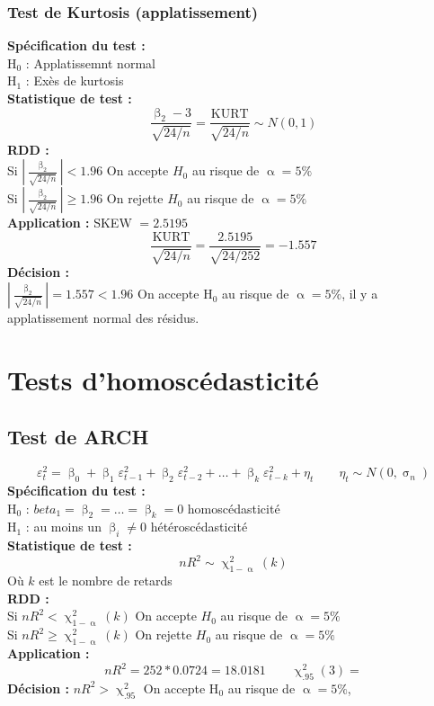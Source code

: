 \documentclass[A4paper]{article}
\begin{document}
\subsubsection{Test de Kurtosis (applatissement)}
\textbf{Spécification du test :} \\
H$_0$ : Applatissemnt normal \\
H$_1$ : Exès de kurtosis \\
\textbf{Statistique de test :}
\begin{equation*}
		\frac{\upbeta_2-3}{\sqrt{24/n}}=  \frac{\text{KURT}}{\sqrt{24/n}} \sim N(0,1)
\end{equation*}
\textbf{RDD :} \\
Si $\left| \frac{\upbeta_2}{\sqrt{24/n}} \right|  < 1.96$ On accepte $H_0$ au risque de $\upalpha = 5\% $\\
Si $\left| \frac{\upbeta_2}{\sqrt{24/n}} \right|  \geq 1.96$ On rejette $H_0$ au risque de $\upalpha = 5\%$ \\
\textbf{Application :} SKEW $= 2.5195 $
\begin{equation*}
	\frac{\text{KURT}}{\sqrt{24/n}} = \frac{2.5195}{\sqrt{24/252}} = -1.557
\end{equation*}
\textbf{Décision :}\\
$\left| \frac{\upbeta_2}{\sqrt{24/n}} \right| = 1.557 < 1.96 $ On accepte H$_0$ au risque de  $\upalpha=5\%$, il y a applatissement normal des résidus.

\newpage
\section{Tests d'homoscédasticité}
\subsection{Test de ARCH}
\begin{equation*}
		\varepsilon^2_t = \upbeta_0 + \upbeta_1 \varepsilon^2_{t-1} + \upbeta_2 \varepsilon^2_{t-2} + \ldots + \upbeta_k \varepsilon^2_{t-k} + \eta_t \qquad \eta_t \sim N(0,\upsigma_n)
\end{equation*}
\textbf{Spécification du test :} \\
H$_0$ : $beta_1 = \upbeta_2 = \ldots = \upbeta_k = 0$ homoscédasticité \\
H$_1$ : au moins un $\upbeta_i \neq 0$ hétéroscédasticité \\
\textbf{Statistique de test :}
\begin{equation*}
		nR^2 \sim \upchi^2_{1-\upalpha}(k)
\end{equation*}
Où $k$ est le nombre de retards \\
\textbf{RDD :} \\
Si $nR^2 < \upchi^2_{1-\upalpha}(k)$ On accepte $H_0$ au risque de $\upalpha = 5\%$\\
Si $nR^2 \geq \upchi^2_{1-\upalpha}(k)$ On rejette $H_0$ au risque de $\upalpha = 5\%$ \\
\textbf{Application :}
\begin{equation*}
	nR^2 = 252 * 0.0724 = 18.0181 \qquad \upchi^2_{.95}(3) =  
\end{equation*}
\textbf{Décision : }
$nR^2 > \upchi^2_{.95}$ On accepte H$_0$ au risque de $\upalpha = 5\%$,
\newpage
\end{document}
